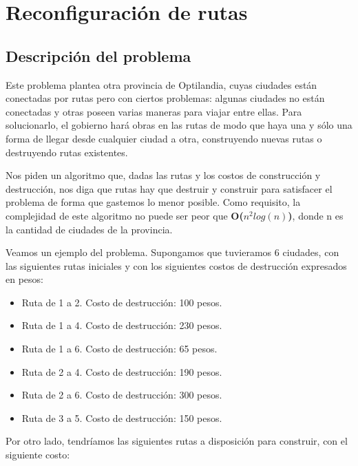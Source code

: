 \section{Reconfiguración de rutas}

\subsection{Descripción del problema}
Este problema plantea otra provincia de Optilandia, cuyas ciudades están conectadas por rutas pero con ciertos problemas: algunas ciudades no están conectadas y otras poseen varias maneras para viajar entre ellas. Para solucionarlo, el gobierno hará obras en las rutas de modo que haya una y sólo una forma de llegar desde cualquier ciudad a otra, construyendo nuevas rutas o destruyendo rutas existentes. 
\\
\par
Nos piden un algoritmo que, dadas las rutas y los costos de construcción y destrucción, nos diga que rutas hay que destruir y construir para satisfacer el problema de forma que gastemos lo menor posible. Como requisito, la complejidad de este algoritmo no puede ser peor que \textbf{O($n^2log(n)$)}, donde n es la cantidad de ciudades de la provincia.
\\
\par
Veamos un ejemplo del problema. Supongamos que tuvieramos 6 ciudades, con las siguientes rutas iniciales y con los siguientes costos de destrucción expresados en pesos:
\begin{itemize}
\item Ruta de 1 a 2. Costo de destrucción: 100 pesos.
\item Ruta de 1 a 4. Costo de destrucción: 230 pesos.
\item Ruta de 1 a 6. Costo de destrucción: 65 pesos.
\item Ruta de 2 a 4. Costo de destrucción: 190 pesos.
\item Ruta de 2 a 6. Costo de destrucción: 300 pesos.
\item Ruta de 3 a 5. Costo de destrucción: 150 pesos.
\end{itemize}

Por otro lado, tendríamos las siguientes rutas a disposición para construir, con el siguiente costo:

